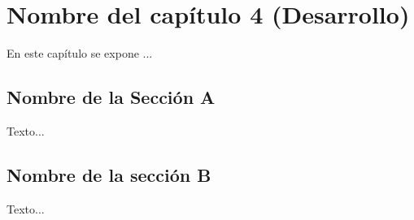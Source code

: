 


\chapter{Nombre del capítulo 4 (Desarrollo)}
\label{Desarrollo}

\noindent En este capítulo se expone ...

\section{Nombre de la Sección A} \label{EtiquetaDeSeccion41}
\noindent Texto...

\section{Nombre de la sección B} \label{EtiquetaDeSeccion42}
\noindent Texto...

